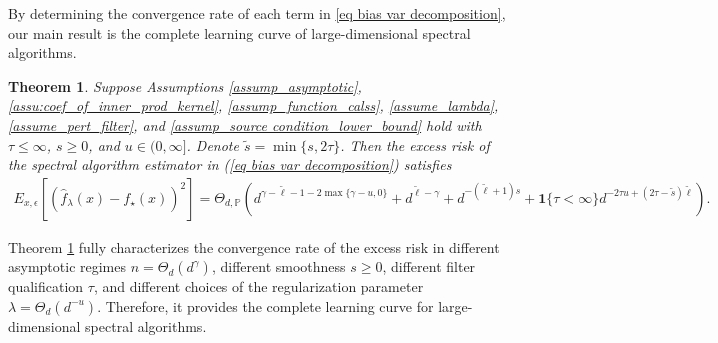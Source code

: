 \documentclass{article}
\theoremstyle{plain}
\newtheorem{theorem}{Theorem}[section]
\theoremstyle{definition}
\theoremstyle{remark}
\newcommand{\green}{\color{green}}
\newcommand{\dhnote}[1]{{\color{red}[#1]} } %
\begin{document}
By determining the convergence rate of each term in \eqref{eq bias var decomposition}, our main result is the complete learning curve of large-dimensional spectral algorithms.

\begin{theorem}\label{theorem_learn_curve}
    Suppose Assumptions \ref{assump_asymptotic}, \ref{assu:coef_of_inner_prod_kernel}, 
\ref{assump_function_calss},
\ref{assume_lambda}, 
\ref{assume_pert_filter},
and \ref{assump_source condition_lower_bound} hold with $\tau \leq \infty$, $s \geq 0$, and $u \in (0, \infty]$. 
Denote $\tilde{s}=\min\{s, 2\tau\}$. Then the excess risk of the spectral algorithm estimator in (\ref{eq bias var decomposition}) satisfies
\begin{equation*}
\begin{aligned}
    E_{x, \epsilon} \left[ \left(\hat{f}_{\lambda}(x) - f_{\star}(x) \right)^{2} \right]
= \Theta_{d, \mathbb{P}} \left( 
d^{\gamma - \tilde{\ell} - 1 - 2  \max\{\gamma - u, 0\}}
+ d^{\tilde{\ell} - \gamma}
+ d^{-(\tilde{\ell} + 1)  s}
+ \mathbf{1}\{\tau<\infty\} d^{-2  \tau  u + (2  \tau - \tilde{s})  \tilde{\ell}}
\right).
\end{aligned}
\end{equation*}
\end{theorem}

Theorem \ref{theorem_learn_curve} fully characterizes the convergence rate of the excess risk in different asymptotic regimes $n = \Theta_d( d^{\gamma} )$, different smoothness $s \geq 0$, different filter qualification $\tau$, and different choices of the regularization parameter $\lambda=\Theta_d(d^{-u})$. Therefore, it provides the complete learning curve for large-dimensional spectral algorithms. 
\end{document}
